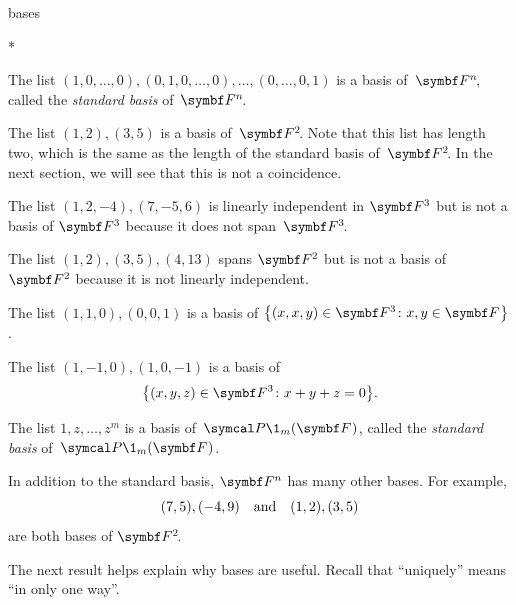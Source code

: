 
\begin{example}[ex_bases]{bases}
\begin{subtheorem}*
\item
The list $
(1, 0, \dots, 0), (0, 1, 0, \dots, 0), \dots, (0, \dots, 0, 1)
$
is a basis of~$\FF{n}$, called the \emph{standard basis}
of~$\FF{n}$.
\item
The list $(1,2), (3,5)$ is a basis of~$\FF{2}$. Note that this list has length two, which is the same as the length of the standard basis of~$\FF2$. In the next section, we will see that this is not a coincidence.
\item
The list $(1,2, -4), (7, -5, 6)$ is linearly independent in $\F3$ but is not a
basis of $\F{3}$ because it does not span~$\FF{3}$.
\item
The list $(1,2), (3,5), (4,13)$ spans $\F{2}$ but is not a basis of $\F{2}$ because it is not linearly independent.
\item
The list $(1, 1, 0), (0, 0, 1) $ is a basis of $\br[\big]{(x, x, y) \in \F{3} \colon x, y \in \F{}}$.
\item
The list $(1, -1, 0), (1, 0, -1) $ is a basis of
\[
\br[\big]{(x, y, z) \in \F{3} \colon x + y + z = 0}.
\]
\item
The list $1, z, \dots, z^m$ is a basis of~$\P\1_m(\F{})$, called the
\emph{standard basis}
of~$\P\1_m(\F{})$.%
\end{subtheorem}
\exampleitemend
\end{example}

In addition to the standard basis, $\F{n}$ has many other bases. For example,
\[
(7, 5), (-4, 9) \quad \text{and} \quad (1,2), (3,5)
\]
are both bases of $\FF{2}$.

The next result helps explain why bases are useful. Recall that ``uniquely'' means ``in only one way''\!.


\pagebreak[3]


